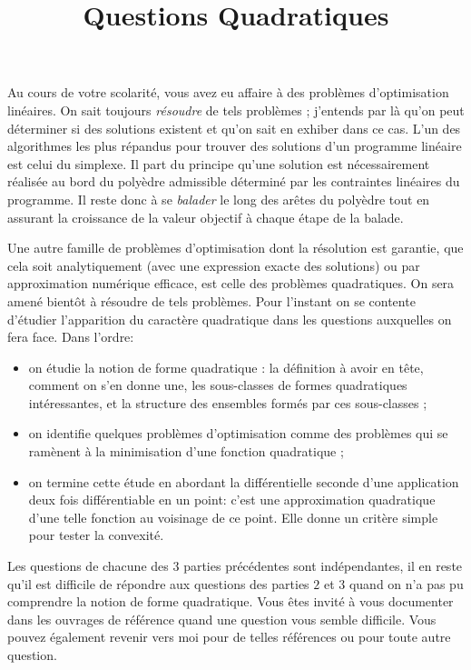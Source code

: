 \documentclass[11pt, a4paper]{article}
\title{%
  { \huge Questions Quadratiques }%
}
\author{}
\date{}
\begin{document}
\maketitle\thispagestyle{fancy}

Au cours de votre scolarité, vous avez eu affaire à des problèmes
d'optimisation linéaires. On sait toujours \emph{résoudre} de tels
problèmes ; j'entends par là qu'on peut déterminer si des solutions
existent et qu'on sait en exhiber dans ce cas. L'un des algorithmes
les plus répandus pour trouver des solutions d'un programme linéaire
est celui du simplexe. Il part du principe qu'une solution est
nécessairement réalisée au bord du polyèdre admissible déterminé par
les contraintes linéaires du programme. Il reste donc à se
\textit{balader} le long des arêtes du polyèdre tout en assurant la
croissance de la valeur objectif à chaque étape de la balade.

Une autre famille de problèmes d'optimisation dont la résolution est
garantie, que cela soit analytiquement (avec une expression exacte des
solutions) ou par approximation numérique efficace, est celle des
problèmes quadratiques. On sera amené bientôt à résoudre de tels
problèmes. Pour l'instant on se contente d'étudier l'apparition du
caractère quadratique dans les questions auxquelles on fera face. Dans
l'ordre:
\begin{itemize}
\item[\textbullet] on étudie la notion de forme quadratique : la définition à avoir
  en tête, comment on s'en donne une, les sous-classes de formes
  quadratiques intéressantes, et la structure des ensembles formés par
  ces sous-classes ;
\item[\textbullet] on identifie quelques problèmes d'optimisation
  comme des problèmes qui se ramènent à la minimisation d'une fonction
  quadratique ;
\item[\textbullet] on termine cette étude en abordant la différentielle seconde
  d'une application deux fois différentiable en un point: c'est une
  approximation quadratique d'une telle fonction au voisinage de ce
  point. Elle donne un critère simple pour tester la convexité. 
\end{itemize}

Les questions de chacune des $3$ parties précédentes sont
indépendantes, il en reste qu'il est difficile de répondre aux
questions des parties $2$ et $3$ quand on n'a pas pu comprendre la
notion de forme quadratique. Vous êtes invité à vous documenter dans
les ouvrages de référence quand une question vous semble
difficile. Vous pouvez également revenir vers moi pour de telles
références ou pour toute autre question.
\end{document}
